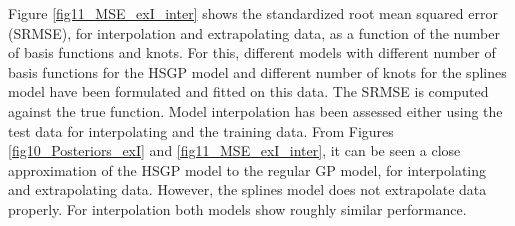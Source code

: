 \documentclass[]{interact}
\theoremstyle{plain}%
\theoremstyle{definition}
\theoremstyle{remark}
\begin{document}
Figure \ref{fig11_MSE_exI_inter} shows the  standardized root mean squared error (SRMSE), for interpolation and extrapolating data, as a function of the number of basis functions and knots. For this, different models with different number of basis functions for the HSGP model and different number of knots for the splines model have been formulated and fitted on this data. The SRMSE is computed against the true function. Model interpolation has been assessed either using the test data for interpolating and the training data. From Figures \ref{fig10_Posteriors_exI} and \ref{fig11_MSE_exI_inter}, it can be seen a close approximation of the HSGP model to the regular GP model, for interpolating and extrapolating data. However, the splines model does not extrapolate data properly. For interpolation both models show roughly similar performance.
\end{document}
